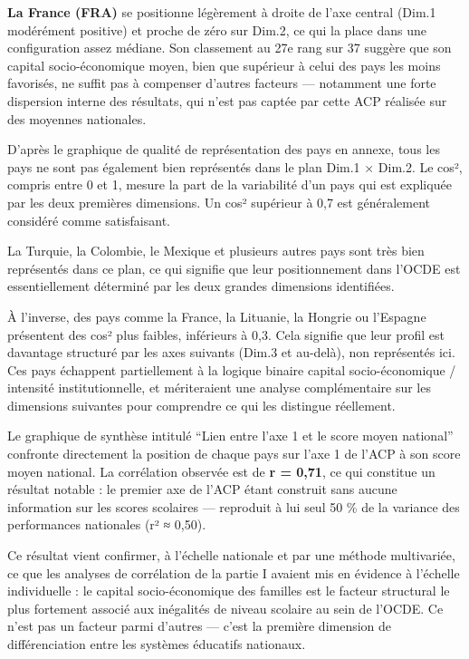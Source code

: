 \documentclass[
  french,
  11pt,
  a4paper,
]{report}
\begin{document}
\textbf{La France (FRA)} se positionne légèrement à droite de l'axe
central (Dim.1 modérément positive) et proche de zéro sur Dim.2, ce qui
la place dans une configuration assez médiane. Son classement au 27e
rang sur 37 suggère que son capital socio-économique moyen, bien que
supérieur à celui des pays les moins favorisés, ne suffit pas à
compenser d'autres facteurs --- notamment une forte dispersion interne
des résultats, qui n'est pas captée par cette ACP réalisée sur des
moyennes nationales.

D'après le graphique de qualité de représentation des pays en annexe,
tous les pays ne sont pas également bien représentés dans le plan Dim.1
× Dim.2. Le cos², compris entre 0 et 1, mesure la part de la variabilité
d'un pays qui est expliquée par les deux premières dimensions. Un cos²
supérieur à 0,7 est généralement considéré comme satisfaisant.

La Turquie, la Colombie, le Mexique et plusieurs autres pays sont très
bien représentés dans ce plan, ce qui signifie que leur positionnement
dans l'OCDE est essentiellement déterminé par les deux grandes
dimensions identifiées.

À l'inverse, des pays comme la France, la Lituanie, la Hongrie ou
l'Espagne présentent des cos² plus faibles, inférieurs à 0,3. Cela
signifie que leur profil est davantage structuré par les axes suivants
(Dim.3 et au-delà), non représentés ici. Ces pays échappent
partiellement à la logique binaire capital socio-économique / intensité
institutionnelle, et mériteraient une analyse complémentaire sur les
dimensions suivantes pour comprendre ce qui les distingue réellement.

Le graphique de synthèse intitulé ``Lien entre l'axe 1 et le score moyen
national'' confronte directement la position de chaque pays sur l'axe 1
de l'ACP à son score moyen national. La corrélation observée est de
\textbf{r = 0,71}, ce qui constitue un résultat notable : le premier axe
de l'ACP étant construit sans aucune information sur les scores
scolaires --- reproduit à lui seul 50 \% de la variance des performances
nationales (r² ≈ 0,50).

Ce résultat vient confirmer, à l'échelle nationale et par une méthode
multivariée, ce que les analyses de corrélation de la partie I avaient
mis en évidence à l'échelle individuelle : le capital socio-économique
des familles est le facteur structural le plus fortement associé aux
inégalités de niveau scolaire au sein de l'OCDE. Ce n'est pas un facteur
parmi d'autres --- c'est la première dimension de différenciation entre
les systèmes éducatifs nationaux.
\end{document}
